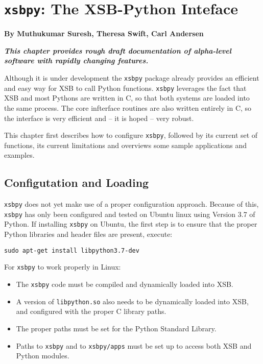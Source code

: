 
\chapter[XSB and Python]{{\tt xsbpy}: The XSB-Python Inteface} \label{chap:xsbpy}

\begin{center}
  {\Large {\bf By Muthukumar Suresh, Theresa Swift, Carl Andersen}}
\end{center}

\noindent
{\large {\bf {\em This chapter provides rough draft documentation of
      alpha-level software with rapidly changing features.}}}

%

Although it is under development the {\tt xsbpy} package already
provides an efficient and easy way for XSB to call Python functions.
{\tt xsbpy} leverages the fact that XSB and most Pythons are written
in C, so that both systems are loaded into the same process. The core
infterface routines are also written entirely in C, so the interface
is very efficient and -- it is hoped -- very robust.

This chapter first describes how to configure {\tt xsbpy}, followed by
its current set of functions, its current limitations and overviews
some sample applications and examples.

\section{Configutation and Loading}

{\tt xsbpy} does not yet make use of a proper configuration approach.
Because of this, {\tt xsbpy} has only been configured and tested on
Ubuntu linux using Version 3.7 of Python.  If installing {\tt xsbpy}
on Ubuntu, the first step is to ensure that the proper Python
libraries and header files are present, execute:

{\tt sudo apt-get install libpython3.7-dev}



For {\tt xsbpy} to work properly in Linux:
\begin{itemize}
\item The {\tt xsbpy} code must be compiled and dynamically loaded into XSB.
\item A version of {\tt libpython.so} also needs to be dynamically
  loaded into XSB, and configured with the proper C library paths.
\item The proper paths must be set for the Python Standard Library.
\item Paths to {\tt xsbpy} and to {\tt xsbpy/apps} must be set up to
  access both XSB and Python modules.
\end{itemize}


